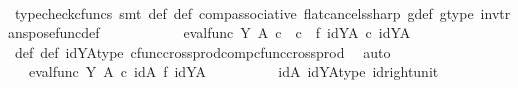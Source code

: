 \begin{isabellebody}
\ \ \ \ \ \ \ \ \isamarkupfalse%
\ {\isacharparenleft}{\kern0pt}typecheck{\isacharunderscore}{\kern0pt}cfuncs{\isacharcomma}{\kern0pt}\ smt\ {\isasymphi}{\isacharunderscore}{\kern0pt}def\ {\isasympsi}{\isacharunderscore}{\kern0pt}def\ comp{\isacharunderscore}{\kern0pt}associative{}\ flat{\isacharunderscore}{\kern0pt}cancels{\isacharunderscore}{\kern0pt}sharp\ g{\isacharunderscore}{\kern0pt}def\ g{\isacharunderscore}{\kern0pt}type\ inv{\isacharunderscore}{\kern0pt}transpose{\isacharunderscore}{\kern0pt}func{\isacharunderscore}{\kern0pt}def{}{\isacharparenright}{\kern0pt}\isanewline
\ \ \ \ \ \ \isamarkupfalse%
\ \isamarkupfalse%
\ {\isachardoublequoteopen}{\isachardot}{\kern0pt}{\isachardot}{\kern0pt}{\isachardot}{\kern0pt}\ {\isacharequal}{\kern0pt}\ eval{\isacharunderscore}{\kern0pt}func\ Y\ A\ {\isasymcirc}\isactrlsub c\ {\isacharparenleft}{\kern0pt}{\isacharparenleft}{\kern0pt}{\isasymphi}\ {\isasymcirc}\isactrlsub c\ {\isasympsi}{\isacharparenright}{\kern0pt}\ {\isasymtimes}\isactrlsub f\ {\isacharparenleft}{\kern0pt}id{\isacharparenleft}{\kern0pt}Y\isactrlbsup A\isactrlesup {\isacharparenright}{\kern0pt}\ {\isasymcirc}\isactrlsub c\ id{\isacharparenleft}{\kern0pt}Y\isactrlbsup A\isactrlesup {\isacharparenright}{\kern0pt}{\isacharparenright}{\kern0pt}{\isacharparenright}{\kern0pt}{\isachardoublequoteclose}\isanewline
\ \ \ \ \ \ \ \ \isamarkupfalse%
\ {\isasymphi}{\isacharunderscore}{\kern0pt}def\ {\isasympsi}{\isacharunderscore}{\kern0pt}def\ idYA{\isacharunderscore}{\kern0pt}type\ cfunc{\isacharunderscore}{\kern0pt}cross{\isacharunderscore}{\kern0pt}prod{\isacharunderscore}{\kern0pt}comp{\isacharunderscore}{\kern0pt}cfunc{\isacharunderscore}{\kern0pt}cross{\isacharunderscore}{\kern0pt}prod\ \isamarkupfalse%
\ auto\ \ \ \ \ \ \ \ \isanewline
\ \ \ \ \ \ \isamarkupfalse%
\ \isamarkupfalse%
\ {\isachardoublequoteopen}{\isachardot}{\kern0pt}{\isachardot}{\kern0pt}{\isachardot}{\kern0pt}\ {\isacharequal}{\kern0pt}\ eval{\isacharunderscore}{\kern0pt}func\ Y\ A\ {\isasymcirc}\isactrlsub c\ id{\isacharparenleft}{\kern0pt}A{\isacharparenright}{\kern0pt}\ {\isasymtimes}\isactrlsub f\ id{\isacharparenleft}{\kern0pt}Y\isactrlbsup A\isactrlesup {\isacharparenright}{\kern0pt}{\isachardoublequoteclose}\isanewline
\ \ \ \ \ \ \ \ \isamarkupfalse%
\ idA\ idYA{\isacharunderscore}{\kern0pt}type\ id{\isacharunderscore}{\kern0pt}right{\isacharunderscore}{\kern0pt}unit{}\ \isamarkupfalse%

\end{isabellebody}
